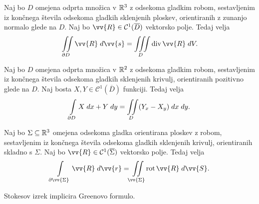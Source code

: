 
\begin{izrek}[Gauss]
Naj bo $D$ omejena odprta množica v $\mathbb{R}^3$ z odsekoma gladkim
robom, sestavljenim iz končnega števila odsekoma gladkih sklenjenih
ploskev, orientiranih z zunanjo normalo glede na $D$. Naj bo
$\vv{R} \in \mathcal{C}^1(\overline{D})$ vektorsko
polje. Tedaj velja
\[
\liint_{\partial D} \vv{R}\;d\vv{s} = \liiint_D \dv\vv{R}\;dV.
\]
\end{izrek}

\begin{izrek}
Naj bo $D$ omejena odprta množica v $\mathbb{R}^2$ z odsekoma gladkim
robom, sestavljenim iz končnega števila odsekoma gladkih sklenjenih
krivulj, orientiranih pozitivno glede na $D$. Naj bosta
$X, Y \in \mathcal{C}^1(\overline{D})$ funkciji. Tedaj velja
\[
\int\limits_{\partial D} X\;dx + Y\;dy = \iint\limits_D (Y_x - X_y)\;dx\;dy.
\]
\end{izrek}

\begin{izrek}[Stokes]
Naj bo $\Sigma \subseteq \mathbb{R}^3$ omejena odsekoma gladka orientirana
ploskev z robom, sestavljenim iz končnega števila odsekoma gladkih
sklenjenih krivulj, orientiranih skladno s $\Sigma$. Naj bo
$\vv{R} \in \mathcal{C}^1(\overline{\Sigma})$ vektorsko polje.
Tedaj velja
\[
\lint_{\partial \vv{\Sigma}} \vv{R}\;d\vv{r} =
\liint_{\vv{\Sigma}} \rot\vv{R}\;d\vv{S}.
\]
\end{izrek}

\begin{opomba}
Stokesov izrek implicira Greenovo formulo.
\end{opomba}

